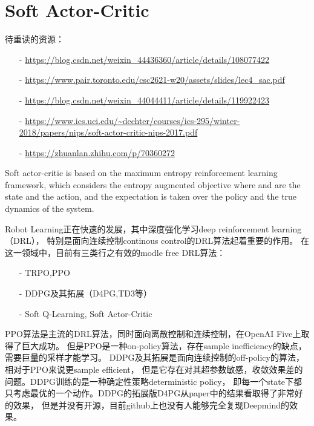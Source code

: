 ﻿\chapter{Soft Actor-Critic}

待重读的资源：
\begin{itemize}
\setlength{\parskip}{0pt}
\item[-]
\url{https://blog.csdn.net/weixin_44436360/article/details/108077422}

\item[-]
\url{https://www.pair.toronto.edu/csc2621-w20/assets/slides/lec4_sac.pdf}

\item[-]
\url{https://blog.csdn.net/weixin_44044411/article/details/119922423}

\item[-]
\url{https://www.ics.uci.edu/~dechter/courses/ics-295/winter-2018/papers/nips/soft-actor-critic-nips-2017.pdf}

\item[-]
\url{https://zhuanlan.zhihu.com/p/70360272}
\end{itemize}



Soft actor-critic is based on the maximum entropy reinforcement learning 
framework, which considers the entropy augmented objective where and are 
the state and the action, and the expectation is taken over the policy and 
the true dynamics of the system.

Robot Learning正在快速的发展，其中深度强化学习deep reinforcement learning（DRL），
特别是面向连续控制continous control的DRL算法起着重要的作用。
在这一领域中，目前有三类行之有效的modle free DRL算法：
\begin{itemize}
\setlength{\parskip}{0pt}
\item[-]
TRPO,PPO
\item[-]
DDPG及其拓展（D4PG,TD3等）
\item[-]
Soft Q-Learning, Soft Actor-Critic
\end{itemize}


PPO算法是主流的DRL算法，同时面向离散控制和连续控制，在OpenAI Five上取得了巨大成功。
但是PPO是一种on-policy算法，存在sample inefficiency的缺点，需要巨量的采样才能学习。
DDPG及其拓展是面向连续控制的off-policy的算法，相对于PPO来说更sample efficient，
但是它存在对其超参数敏感，收敛效果差的问题。DDPG训练的是一种确定性策略deterministic policy，
即每一个state下都只考虑最优的一个动作。DDPG的拓展版D4PG从paper中的结果看取得了非常好的效果，
但是并没有开源，目前github上也没有人能够完全复现Deepmind的效果。

